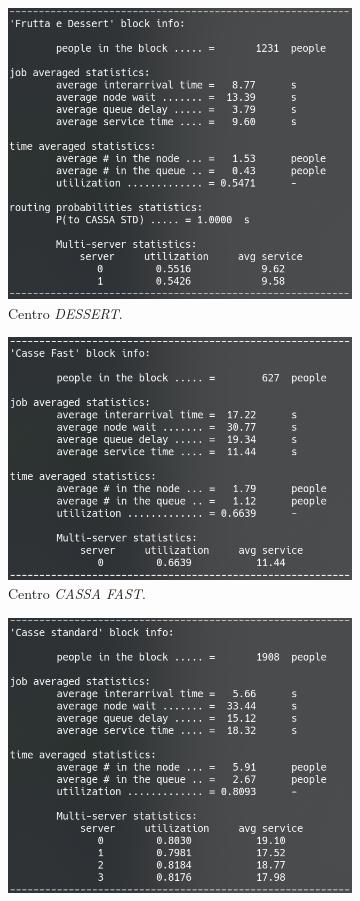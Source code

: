 \documentclass{article}
\begin{document}
\begin{figure}[H]
\begin{subfigure}{.5\textwidth}
  \includegraphics[width=.8\linewidth]{img/dessert.png}
  \caption{Centro \textit{DESSERT}.}
  \label{fig:dessert}
\end{subfigure}%
\begin{subfigure}{.5\textwidth}
  \centering
  \includegraphics[width=.8\linewidth]{img/cassa_fast.png}
  \caption{Centro \textit{CASSA FAST}.}
  \label{fig:cassa_fast}
\end{subfigure}
\begin{subfigure}{.5\textwidth}
  \centering
  \includegraphics[width=.8\linewidth]{img/cassa_standard.png}

\end{subfigure}
\end{figure}
\end{document}
